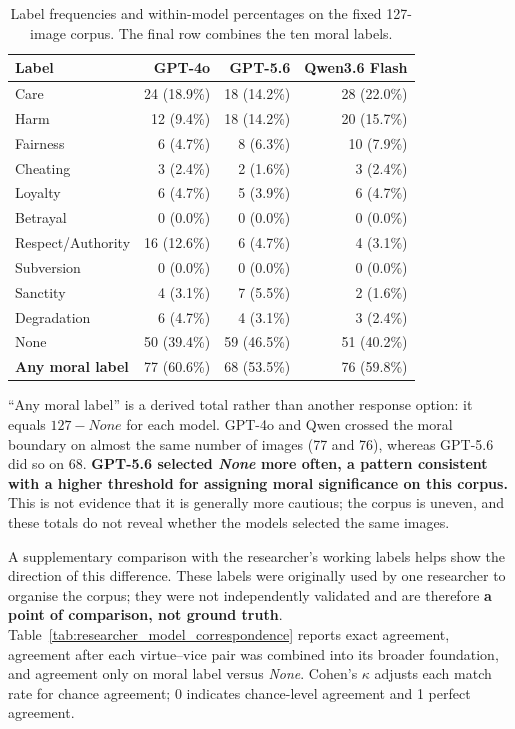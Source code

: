 \begin{table}[!htbp]
    \centering
    \caption{Label frequencies and within-model percentages on the fixed
    127-image corpus. The final row combines the ten moral labels.}
    \label{tab:label_distributions}
    \small
    \begin{tabular}{lrrr}
        \toprule
        Label & GPT-4o & GPT-5.6 & Qwen3.6 Flash \\
        \midrule
        Care                & 24 (18.9\%) & 18 (14.2\%) & 28 (22.0\%) \\
        Harm                & 12 (9.4\%)  & 18 (14.2\%) & 20 (15.7\%) \\
        Fairness            & 6 (4.7\%)   & 8 (6.3\%)   & 10 (7.9\%) \\
        Cheating            & 3 (2.4\%)   & 2 (1.6\%)   & 3 (2.4\%) \\
        Loyalty             & 6 (4.7\%)   & 5 (3.9\%)   & 6 (4.7\%) \\
        Betrayal            & 0 (0.0\%)   & 0 (0.0\%)   & 0 (0.0\%) \\
        Respect/Authority   & 16 (12.6\%) & 6 (4.7\%)   & 4 (3.1\%) \\
        Subversion          & 0 (0.0\%)   & 0 (0.0\%)   & 0 (0.0\%) \\
        Sanctity            & 4 (3.1\%)   & 7 (5.5\%)   & 2 (1.6\%) \\
        Degradation         & 6 (4.7\%)   & 4 (3.1\%)   & 3 (2.4\%) \\
        None                & 50 (39.4\%) & 59 (46.5\%) & 51 (40.2\%) \\
        \midrule
        \textbf{Any moral label} & 77 (60.6\%) & 68 (53.5\%) & 76 (59.8\%) \\
        \bottomrule
    \end{tabular}
\end{table}

``Any moral label'' is a derived total rather than another response option: it
equals \(127-\textit{None}\) for each model. GPT-4o and Qwen crossed the moral
boundary on almost the same number of images (77 and 76), whereas GPT-5.6 did
so on 68. \textbf{GPT-5.6 selected \textit{None} more often, a pattern
consistent with a higher threshold for assigning moral significance on this
corpus.} This is not evidence that it is generally more cautious; the corpus is
uneven, and these totals do not reveal whether the models selected the same
images.

A supplementary comparison with the researcher's working labels helps show
the direction of this difference. These labels were originally used by one
researcher to organise the corpus; they were not independently validated and
are therefore \textbf{a point of comparison, not ground truth}.
Table~\ref{tab:researcher_model_correspondence} reports exact agreement,
agreement after each virtue--vice pair was combined into its broader
foundation, and agreement only on moral label versus \textit{None}. Cohen's
\(\kappa\) adjusts each match rate for chance agreement; 0 indicates
chance-level agreement and 1 perfect agreement.

